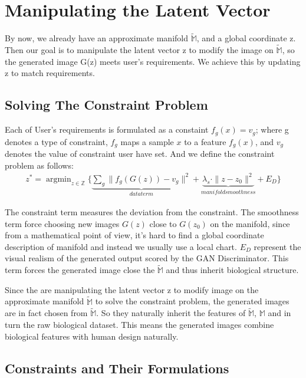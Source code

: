 \section{Manipulating the Latent Vector}
By now, we already have an approximate manifold $\widetilde{\mathbb{M}}$, and a global coordinate z. Then our goal is to manipulate the latent vector z to modify the image on $\widetilde{\mathbb{M}}$, so the generated image G(z) meets user’s requirements. We achieve this by updating z to match requirements.

\subsection{Solving The Constraint Problem}
Each of User's requirements is formulated as a constaint $f_g(x)=v_g$; where g denotes a type of constraint, $f_g$ maps a sample $x$ to a feature $f_g(x)$, and $v_g$ denotes the value of constraint user have set. And we define the constraint problem as follows:
\begin{equation}
\begin{aligned}
z^* = \mathop{\arg\min}_{z \in \mathbb{Z}} \{\underbrace{\sum_{g}\|f_g(G(z))-v_g\|^2}_{data term} +\underbrace{\lambda_s\cdot\|z-z_0\|^2}_{manifold smoothness} +E_D\}
\end{aligned}
\end{equation}

The constraint term measures the deviation from the constraint. The smoothness term force choosing new images $G(z)$ close to $G(z_0)$ on the manifold, since from a mathematical point of view, it’s hard to find a global coordinate description of manifold and instead we usually use a local chart. $E_D$ represent the visual realism of the generated output scored by the GAN Discriminator. This term forces the generated image close the $\widetilde{\mathbb{M}}$ and thus inherit biological structure. 

Since the are manipulating the latent vector z to modify image on the approximate manifold $\widetilde{\mathbb{M}}$ to solve the constraint problem, the generated images are in fact chosen from $\widetilde{\mathbb{M}}$. So they naturally inherit the features of $\widetilde{\mathbb{M}}$, $\mathbb{M}$ and in turn the raw biological dataset. This means the generated images combine biological features with human design naturally. 

\subsection{Constraints and Their Formulations}

